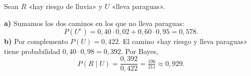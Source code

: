 Sean $R$ «hay riesgo de lluvia» y $U$ «lleva paraguas».

\textbf{a)} Sumamos los dos caminos en los que no lleva paraguas:
\[
P(U^c)=0{,}40\cdot0{,}02+0{,}60\cdot0{,}95=\boxed{0{,}578}.
\]
\textbf{b)} Por complemento $P(U)=0{,}422$. El camino «hay riesgo y lleva paraguas» tiene probabilidad $0{,}40\cdot0{,}98=0{,}392$. Por Bayes,
\[
P(R\mid U)=\frac{0{,}392}{0{,}422}=\boxed{\tfrac{196}{211}}\approx0{,}929.
\]
